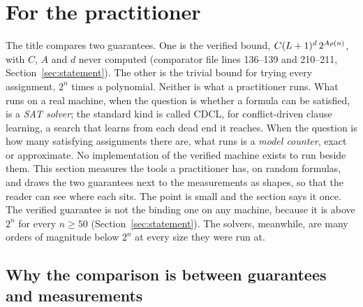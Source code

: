 \section{For the practitioner}
\label{sec:practitioner}

The title compares two guarantees. One is the verified bound,
$C(L+1)^d\,2^{A\rho(n)}$, with $C$, $A$ and $d$ never computed (comparator
file lines 136--139 and 210--211, Section~\ref{sec:statement}). The
other is the trivial bound for trying every assignment, $2^n$ times a
polynomial. Neither is what a practitioner runs. What runs on a real
machine, when the question is whether a formula can be satisfied, is a
\emph{SAT solver}; the standard kind is called CDCL, for
conflict-driven clause learning, a search that learns from each dead
end it reaches. When the question is how many satisfying assignments
there are, what runs is a \emph{model counter}, exact or approximate.
No implementation of the verified machine exists to run beside them.
This section measures the tools a practitioner has, on random formulas,
and draws the two guarantees next to the measurements as shapes, so
that the reader can see where each sits. The point is small and the section says it once. The verified guarantee is not the binding one on any machine, because it is above $2^n$ for every $n \ge 50$
(Section~\ref{sec:statement}). The solvers, meanwhile, are many orders of
magnitude below $2^n$ at every size they were run at.

\subsection{Why the comparison is between guarantees and measurements}
\label{sec:practitioner-why}

